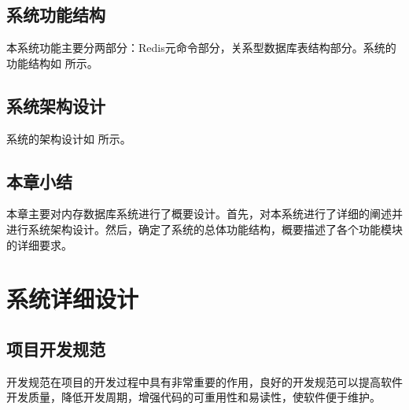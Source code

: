 \documentclass{zjutthesis}
\begin{document}
\section{系统功能结构}
本系统功能主要分两部分：Redis元命令部分，关系型数据库表结构部分。系统的功能结构如%
所示。

\section{系统架构设计}
系统的架构设计如%
所示。

\section{本章小结}
本章主要对内存数据库系统进行了概要设计。首先，对本系统进行了详细的阐述并进行系统架构设计。然后，确定了系统的总体功能结构，概要描述了各个功能模块的详细要求。


\chapter{系统详细设计}
\section{项目开发规范}
开发规范在项目的开发过程中具有非常重要的作用，良好的开发规范可以提高软件开发质量，降低开发周期，增强代码的可重用性和易读性，使软件便于维护。

\backmatter


\nocite{*}                                   %


\appendix

\end{document}
